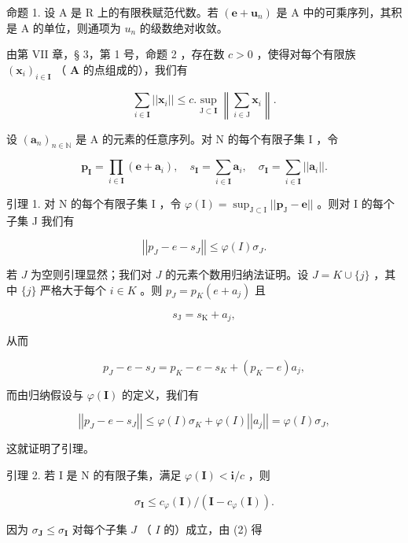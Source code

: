 命题 1. 设 A 是 R 上的有限秩赋范代数。若 \((\boldsymbol{e} + \boldsymbol{u}_{n})\) 是 A 中的可乘序列，其积是 A 的单位，则通项为 \(u_{n}\) 的级数绝对收敛。

由第 VII 章，§ 3，第 1 号，命题 2 ，存在数 \(c > 0\) ，使得对每个有限族 \((\pmb{x}_i)_{i \in \mathbf{I}}\) （ \(\mathbf{A}\) 的点组成的），我们有

\[
\sum_ {i \in \mathbf {I}} | | \boldsymbol {x} _ {i} | | \leqslant c. \sup _ {\mathrm{J} \subset \mathbf {I}} \left\| \sum_ {i \in \mathrm{J}} \boldsymbol {x} _ {i} \right\|.\tag{1}
\]

设 \((\pmb{a}_n)_{n\in \mathbb{N}}\) 是 A 的元素的任意序列。对 N 的每个有限子集 I ，令

\[
\boldsymbol {p} _ {\mathbf {I}} = \prod_ {i \in \mathbf {I}} (\boldsymbol {e} + \boldsymbol {a} _ {i}), \quad s _ {\mathbf {I}} = \sum_ {i \in \mathbf {I}} \boldsymbol {a} _ {i}, \quad \sigma_ {\mathbf {I}} = \sum_ {i \in \mathbf {I}} | | \boldsymbol {a} _ {i} | |.
\]

引理 1. 对 N 的每个有限子集 I ，令 \(\varphi(\mathrm{I}) = \sup_{\mathrm{J} \subset \mathrm{I}} ||\boldsymbol{p}_{\mathrm{J}} - \boldsymbol{e}||\) 。则对 I 的每个子集 J 我们有

\[
\left| \left| p _ {J} - e - s _ {J} \right| \right| \leqslant \varphi (I) \sigma_ {J}.\tag{2}
\]

若 \(J\) 为空则引理显然；我们对 \(J\) 的元素个数用归纳法证明。设 \(J = K \cup \{j\}\) ，其中 \(\{j\}\) 严格大于每个 \(i \in K\) 。则 \(p_J = p_K(e + a_j)\) 且

\[
s _ {\mathrm{J}} = s _ {\mathrm{K}} + a _ {j},
\]

从而

\[
p _ {J} - e - s _ {J} = p _ {K} - e - s _ {K} + (p _ {K} - e) a _ {j},
\]

而由归纳假设与 \(\varphi(\mathbf{I})\) 的定义，我们有

\[
\left| \left| p _ {J} - e - s _ {J} \right| \right| \leqslant \varphi (I) \sigma_ {K} + \varphi (I) \left| \left| a _ {j} \right| \right| = \varphi (I) \sigma_ {J},
\]

这就证明了引理。

引理 2. 若 I 是 N 的有限子集，满足 \(\varphi(\mathbf{I}) < \mathbf{i}/c\) ，则

\[
\sigma_ {\mathbf {I}} \leqslant c _ {\varphi} (\mathbf {I}) / (\mathbf {I} - c _ {\varphi} (\mathbf {I})).
\]

因为 \(\sigma_{\mathbf{J}} \leqslant \sigma_{\mathbf{I}}\) 对每个子集 \(J\) （ \(I\) 的）成立，由 (2) 得

